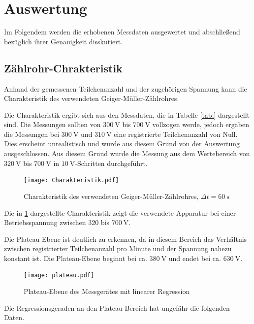 



\section{Auswertung}

Im Folgendem werden die erhobenen Messdaten ausgewertet und abschließend
bezüglich ihrer Genauigkeit disskutiert.

\subsection{Zählrohr-Chrakteristik}

Anhand der gemessenen Teilchenanzahl und der zugehörigen Spannung kann die
Charakteristik des verwendeten Geiger-Müller-Zählrohres.

Die Charakteristik ergibt sich aus den Messdaten, die in Tabelle \ref{tab:}
dargestellt sind. Die Messungen sollten von $\SI{300}{\volt}$ bis $\SI{700}{\volt}$
vollzogen werde, jedoch ergaben die Messungen bei $\SI{300}{\volt}$ und
$\SI{310}{\volt}$ eine registrierte Teilchenanzahl von Null.
Dies erscheint unrealistisch und wurde aus diesem Grund von der Auswertung
ausgeschlossen. Aus diesem Grund wurde die Messung aus dem Wertebereich
von $\SI{320}{\volt}$ bis $\SI{700}{\volt}$ in $\SI{10}{\volt}$-Schritten
durchgeführt.

\begin{figure}
  \centering
  \texttt{[image: Charakteristik.pdf]}
  \caption{Charakteristik des verwendeten Geiger-Müller-Zählrohres, $\Delta t = \SI{60}{\second}$}
  \label{fig:Charakteristik}
\end{figure}

Die in \ref{fig:Charakteristik} dargestellte Charakteristik zeigt die verwendete
Apparatur bei einer Betriebsspannung zwischen $\num{320}$ bis $\SI{700}{\volt}$.

Die Plateau-Ebene ist deutlich zu erkennen, da in diesem Bereich das Verhältnis zwischen
registrierter Teilchenanzahl pro Minute und der Spannung nahezu konstant ist.
Die Plateau-Ebene beginnt bei ca. $\SI{380}{\volt}$ und endet bei ca.
$\SI{630}{\volt}$.

\begin{figure}
  \centering
  \texttt{[image: plateau.pdf]}
  \caption{Plateau-Ebene des Messgerätes mit linearer Regression}
  \label{fig:Plateau}
\end{figure}

Die Regressionsgeraden an den Plateau-Bereich hat ungefähr die folgenden Daten.

